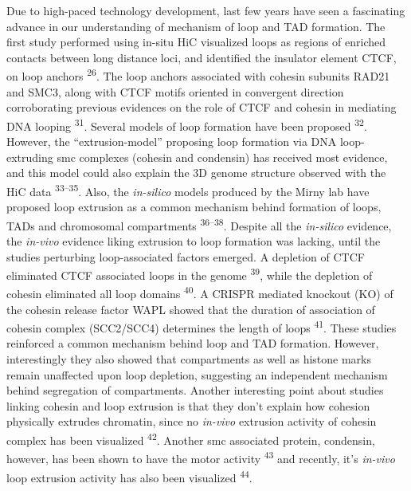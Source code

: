 \documentclass[11pt,twoside]{MPIthesis}
\theoremstyle{definition}
\theoremstyle{definition}
\theoremstyle{definition}
\theoremstyle{remark}
\begin{document}
Due to high-paced technology development, last few years have seen a
fascinating advance in our understanding of mechanism of loop and TAD
formation. The first study performed using in-situ HiC visualized loops
as regions of enriched contacts between long distance loci, and
identified the insulator element CTCF, on loop anchors
\textsuperscript{26}. The loop anchors associated with cohesin subunits
RAD21 and SMC3, along with CTCF motifs oriented in convergent direction
corroborating previous evidences on the role of CTCF and cohesin in
mediating DNA looping \textsuperscript{31}. Several models of loop
formation have been proposed \textsuperscript{32}. However, the
``extrusion-model'' proposing loop formation via DNA loop-extruding smc
complexes (cohesin and condensin) has received most evidence, and this
model could also explain the 3D genome structure observed with the HiC
data \textsuperscript{33--35}. Also, the \emph{in-silico} models
produced by the Mirny lab have proposed loop extrusion as a common
mechanism behind formation of loops, TADs and chromosomal compartments
\textsuperscript{36--38}. Despite all the \emph{in-silico} evidence, the
\emph{in-vivo} evidence liking extrusion to loop formation was lacking,
until the studies perturbing loop-associated factors emerged. A
depletion of CTCF eliminated CTCF associated loops in the genome
\textsuperscript{39}, while the depletion of cohesin eliminated all loop
domains \textsuperscript{40}. A CRISPR mediated knockout (KO) of the
cohesin release factor WAPL showed that the duration of association of
cohesin complex (SCC2/SCC4) determines the length of loops
\textsuperscript{41}. These studies reinforced a common mechanism behind
loop and TAD formation. However, interestingly they also showed that
compartments as well as histone marks remain unaffected upon loop
depletion, suggesting an independent mechanism behind segregation of
compartments. Another interesting point about studies linking cohesin
and loop extrusion is that they don't explain how cohesion physically
extrudes chromatin, since no \emph{in-vivo} extrusion activity of
cohesin complex has been visualized \textsuperscript{42}. Another smc
associated protein, condensin, however, has been shown to have the motor
activity \textsuperscript{43} and recently, it's \emph{in-vivo} loop
extrusion activity has also been visualized \textsuperscript{44}.
\end{document}
